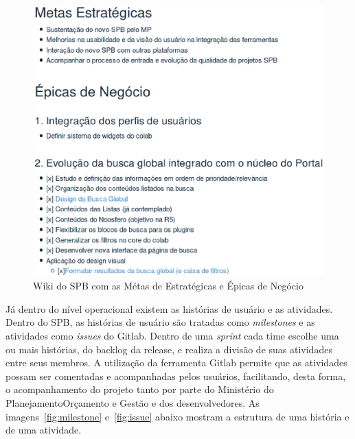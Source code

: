 \begin{figure}[h]
    \centering
        \includegraphics[keepaspectratio=true,scale=0.5]{figuras/wiki.eps}
    \caption{Wiki do SPB com as Métas de Estratégicas e Épicas de Negócio}
    \label{fig:epics-wiki}
\end{figure}



Já dentro do nível operacional existem as histórias de usuário e as atividades. Dentro do SPB, as histórias de usuário são tratadas como \textit{milestones}  e as atividades como \textit{issues} do Gitlab. Dentro de uma \textit{sprint} cada time escolhe uma ou mais  histórias, do backlog da release, e realiza a divisão de suas atividades entre seus membros. A utilização da ferramenta Gitlab permite que as atividades possam ser comentadas e acompanhadas pelos usuários, facilitando, desta forma, o acompanhamento do projeto tanto por parte do Ministério do PlanejamentoOrçamento e Gestão e dos desenvolvedores. As imagens~\ref{fig:milestone} e~\ref{fig:issue} abaixo mostram a estrutura de uma história e de uma atividade.

